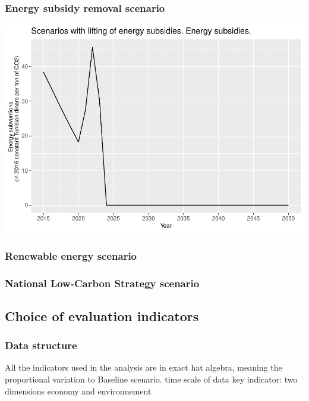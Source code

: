 \documentclass[
]{article}
\begin{document}
\hypertarget{energy-subsidy-removal-scenario}{%
\subsubsection{Energy subsidy removal
scenario}\label{energy-subsidy-removal-scenario}}

\begin{center}\includegraphics[width=0.7\linewidth,height=0.7\textheight]{Modele-ThreeMe-Tunisie_Sequeira_Valilou_Wang_files/figure-latex/unnamed-chunk-7-1} \end{center}

\hypertarget{renewable-energy-scenario}{%
\subsubsection{Renewable energy
scenario}\label{renewable-energy-scenario}}

\hypertarget{national-low-carbon-strategy-scenario}{%
\subsubsection{National Low-Carbon Strategy
scenario}\label{national-low-carbon-strategy-scenario}}

\hypertarget{choice-of-evaluation-indicators}{%
\subsection{Choice of evaluation
indicators}\label{choice-of-evaluation-indicators}}

\hypertarget{data-structure}{%
\subsubsection{Data structure}\label{data-structure}}

All the indicators used in the analysis are in exact hat algebra,
meaning the proportional variation to Baseline scenario. time scale of
data key indicator: two dimensions economy and environnement
\end{document}
